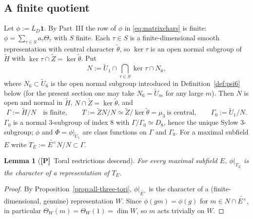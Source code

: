 \documentclass[11pt]{article}
\newcommand{\tH}{\widetilde H}
\newcommand{\tZ}{\widetilde Z}
\newcommand{\tU}{\widetilde U}
\newcommand{\tth}{\widetilde\theta}
\newcommand{\Ptag}{\textnormal{\textbf{[P]}}}
\theoremstyle{plain}
\newtheorem{lemma}[theorem]{Lemma}
\theoremstyle{definition}
\begin{document}
\subsection{A finite quotient}
Let $\phi:=L_D\mathbf1$.  By Part~III the row of $\phi$ in
\eqref{eq:matrixchars} is finite: $\phi=\sum_{\tau\in S}a_\tau\Theta_\tau$
with $S$ finite.  Each $\tau\in S$ is a finite-dimensional smooth
representation with central character $\tth$, so $\ker\tau$ is an open
normal subgroup of $\tH$ with $\ker\tau\cap\tZ=\ker\tth$.  Put
\begin{equation}\label{eq:N}
 N:=\tU_1\cap\bigcap_{\tau\in S}\ker\tau\cap N_6 ,
\end{equation}
where $N_6\subset\tU_6$ is the open normal subgroup introduced in
Definition~\ref{def:psi6} below (for the present section one may take
$N_6=\tU_m$ for any large $m$).  Then $N$ is open and normal in $\tH$,
$N\cap\tZ=\ker\tth$, and
\[
 \Gamma:=\tH/N\quad\text{is finite},\qquad
 T:=\tZ N/N\simeq\tZ/\ker\tth=\mu_3\ \text{is central},\qquad
 \Gamma_0:=\tU_1/N .
\]
$\Gamma_0$ is a normal $3$-subgroup of index $8$ with $\Gamma/\Gamma_0\simeq D_8$,
hence the unique Sylow $3$-subgroup; $\phi$ and $\Phi=\phi|_{\tU_1}$ are
class functions on $\Gamma$ and $\Gamma_0$.  For a maximal subfield
$E$ write $T_E:=\widetilde{E^\times}N/N\subset\Gamma$.

\begin{lemma}[\Ptag\ Toral restrictions descend]\label{lem:toral-descent}
For every maximal subfield $E$, $\phi|_{T_E}$ is the character of a
representation of $T_E$.
\end{lemma}
\begin{proof}
By Proposition~\ref{prop:all-three-tori}, $\phi|_{\widetilde{E^\times}}$ is
the character of a (finite-dimensional, genuine) representation $W$.
Since $\phi(gm)=\phi(g)$ for $m\in N\cap\widetilde{E^\times}$, in
particular $\Theta_W(m)=\Theta_W(1)=\dim W$, so $m$ acts trivially on $W$.
\end{proof}
\end{document}
